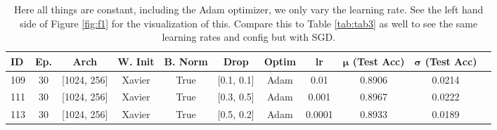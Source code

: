 \documentclass[11pt]{amsart}
\begin{document}

\begin{table}[h]
    \centering
    \begin{tabular}{|l|c|c|c|c|c|c|c|c|c|c|} %
        \hline
        \textbf{ID} & \textbf{Ep.}
        & \textbf{Arch} & \textbf{W. Init}
        & \textbf{B. Norm} & \textbf{Drop}
        & \textbf{Optim} & \textbf{lr}
	& \textbf{$\bm \mu$ (Test Acc)}
        & \textbf{$\bm \sigma$ (Test Acc)} \\ 
        \hline
        109 & 30 & [1024, 256]  & Xavier & True & [0.1, 0.1] & Adam & 0.01 & 0.8906 & 0.0214 \\
        \hline
        111 & 30 & [1024, 256]  & Xavier & True & [0.3, 0.5] & Adam & 0.001 & 0.8967 & 0.0222 \\
        \hline
        113 & 30 & [1024, 256]  & Xavier & True & [0.5, 0.2] & Adam & 0.0001 & 0.8933 & 0.0189 \\  
        \hline
    \end{tabular}
    \caption{Here all things are constant, including the Adam optimizer, we only vary the learning rate.
    See the left hand side of Figure \ref{fig:f1} for the visualization of this.
    Compare this to Table \ref{tab:tab3} as well to see the same learning rates and config but with SGD.}
    \label{tab:tab2}
\end{table}
\end{document}
